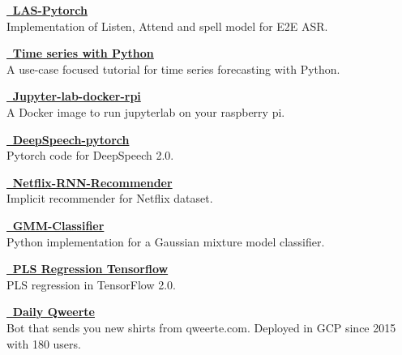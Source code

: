 



\textcolor{SlateGrey}{\textbf{\href{https://github.com/jiwidi/las-pytorch}{ \faGithub \, LAS-Pytorch }}} \\ 
Implementation of Listen, Attend and spell model for E2E ASR.
\newline
{}


\textcolor{SlateGrey}{\textbf{\href{https://github.com/jiwidi/time-series-forecasting-with-python}{\faGithub \,  Time series with Python  }}} \\ 
A use-case focused tutorial for time series forecasting with Python.
\newline
{}


\textcolor{SlateGrey}{\textbf{\href{https://github.com/jiwidi/jupyter-lab-docker-rpi}{\faGithub \, Jupyter-lab-docker-rpi}}} \\ 
A Docker image to run jupyterlab on your raspberry pi. 
\newline
{}


\textcolor{SlateGrey}{\textbf{\href{https://github.com/jiwidi/DeepSpeech-pytorch}{\faGithub \, DeepSpeech-pytorch}}} \\ 
Pytorch code for DeepSpeech 2.0.
\newline
{}



\textcolor{SlateGrey}{\textbf{\href{https://github.com/jiwidi/Netflix-RNN-Recommender}{\faGithub \, Netflix-RNN-Recommender}}} \\ 
Implicit recommender for Netflix dataset.
\newline
{}

\textcolor{SlateGrey}{\textbf{\href{https://github.com/jiwidi/gmm-classifier}{\faGithub \, GMM-Classifier}}} \\ 
Python implementation for a Gaussian mixture model classifier.
\newline
{}

\textcolor{SlateGrey}{\textbf{\href{https://github.com/jiwidi/PLS-regression-tensorflow}{\faGithub \, PLS Regression Tensorflow}}} \\ 
PLS regression in TensorFlow 2.0.
\newline
{}

\textcolor{SlateGrey}{\textbf{\href{https://github.com/jiwidi/DailyQwertee}{\faGithub \, Daily Qweerte}}} \\ 
Bot that sends you new shirts from qweerte.com. Deployed in GCP since 2015 with 180 users.
\newline
{}


